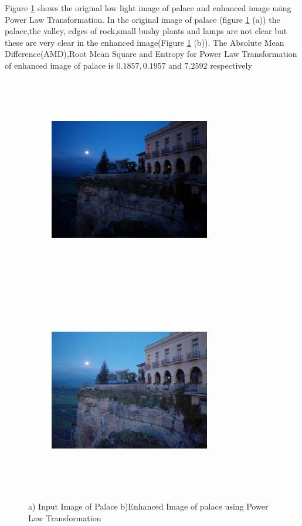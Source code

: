 Figure \ref{fig:palacePowerLaw} shows the original low light image of palace and enhanced image using Power Law Transformation. In the original image of palace (figure \ref{fig:palacePowerLaw} (a))  the palace,the valley, edges of rock,small bushy plants and lamps are not clear but these are very clear in the enhanced image(Figure \ref{fig:palacePowerLaw} (b)). The Absolute Mean Difference(AMD),Root Mean Square and Entropy for Power Law Transformation of enhanced image of palace is $0.1857, 0.1957$ and $7.2592$ respectively      

\begin{figure}
	\begin{subfigure}{8cm}
		\centering    
    	\includegraphics[width=7cm,height=9cm,keepaspectratio]{images/ch5/palace_input.jpg}
    	\caption{} 
    \end{subfigure}
  	\begin{subfigure}{6cm}
  		\centering
  		\includegraphics[width=7cm,height=9cm,keepaspectratio]{images/ch5/palace_power.jpg}
   		\caption{}
  	\end{subfigure}
  	\caption{a) Input Image of Palace b)Enhanced Image of palace using Power Law Transformation}
  	\label{fig:palacePowerLaw}
\end{figure}

